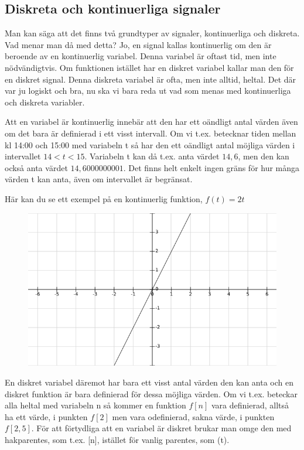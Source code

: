 \documentclass{article}
\begin{document}
\subsection{Diskreta och kontinuerliga signaler}

Man kan säga att det finns två grundtyper av signaler, kontinuerliga och
diskreta. Vad menar man då med detta? Jo, en signal kallas kontinuerlig om
den är beroende av en kontinuerlig variabel. Denna variabel är oftast tid,
men inte nödvändigtvis. Om funktionen istället har en diskret variabel kallar
man den för en diskret signal. Denna diskreta variabel är ofta, men inte
alltid, heltal. Det där var ju logiskt och bra, nu ska vi bara reda ut vad
som menas med kontinuerliga och diskreta variabler.

Att en variabel är kontinuerlig innebär att den har ett oändligt antal värden
även om det bara är definierad i ett visst intervall. Om vi t.ex. betecknar
tiden mellan kl 14:00 och 15:00 med variabeln t så har den ett oändligt antal
möjliga värden i  intervallet $14 < t < 15$. Variabeln t kan då t.ex. anta
värdet $14,6$, men den kan också anta värdet $14,6000000001$. Det finns helt
enkelt ingen gräns för hur många värden t kan anta, även om intervallet är
begränsat.

Här kan du se ett exempel på en kontinuerlig funktion, $f(t)=2t$
\begin{figure}[ht]
\centerline{\includegraphics[scale=0.55]{image06.png}}
\caption{}
\label{}
\end{figure}
\newpage
En diskret variabel däremot har bara ett visst antal värden den kan anta och
en diskret funktion är bara definierad för dessa möjliga värden. Om vi t.ex.
beteckar alla heltal med variabeln n så kommer en funktion $f[n]$ vara
definierad, alltså ha ett värde, i punkten $f[2]$ men vara odefinierad, sakna
värde, i punkten $f[2,5]$. För att förtydliga att en variabel är diskret
brukar man omge den med hakparentes, som t.ex. [n], istället för vanlig
parentes, som (t).
\end{document}
